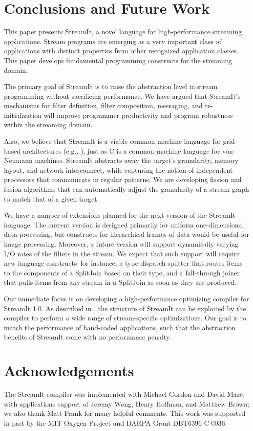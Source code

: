 \section{Conclusions and Future Work}
\label{sec:conc}

This paper presents StreamIt, a novel language for high-performance
streaming applications.  Stream programs are emerging as a very
important class of applications with distinct properties from other
recognized application classes.  This paper develops fundamental
programming constructs for the streaming domain.

The primary goal of StreamIt is to raise the abstraction level in
stream programming without sacrificing performance.  We have argued
that StreamIt's mechanisms for filter definition, filter composition,
messaging, and re-initialization will improve programmer productivity
and program robustness within the streaming domain.

Also, we believe that StreamIt is a viable common machine language for
grid-based architectures (e.g., \cite{smartmemories,rawshort,trips}), just
as C is a common machine language for von-Neumann machines.  StreamIt
abstracts away the target's granularity, memory layout, and network
interconnect, while capturing the notion of independent processors
that communicate in regular patterns.  We are developing fission and
fusion algorithms that can automatically adjust the granularity of a
stream graph to match that of a given target.

We have a number of extensions planned for the next version of the
StreamIt language.  The current version is designed primarily for
uniform one-dimensional data processing, but constructs for hierarchical
frames of data would be useful for image processing.  Moreover, a future
version will support dynamically varying I/O rates of the filters in the
stream.  We expect that such support will require new language
constructs--for instance, a type-dispatch splitter that routes items to
the components of a SplitJoin based on their type, and a fall-through
joiner that pulls items from any stream in a SplitJoin as soon as they
are produced.

Our immediate focus is on developing a high-performance optimizing
compiler for StreamIt 1.0.  As described in \cite{streamittech622},
the structure of StreamIt can be exploited by the compiler to perform
a wide range of stream-specific optimizations.  Our goal is to match
the performance of hand-coded applications, such that the abstraction
benefits of StreamIt come with no performance penalty.

\section{Acknowledgements}

The StreamIt compiler was implemented with Michael Gordon and David
Maze, with applications support of Jeremy Wong, Henry Hoffman, and
Matthew Brown; we also thank Matt Frank for many helpful comments.
This work was supported in part by the MIT Oxygen Project and DARPA
Grant DBT6396-C-0036.
